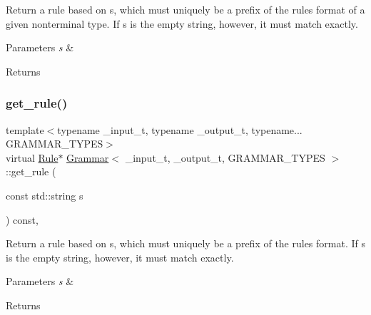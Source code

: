 Return a rule based on s, which must uniquely be a prefix of the rule\textquotesingle{}s format of a given nonterminal type. If s is the empty string, however, it must match exactly. 
\begin{DoxyParams}{Parameters}
{\em s} & \\
\hline
\end{DoxyParams}
\begin{DoxyReturn}{Returns}

\end{DoxyReturn}
\mbox{\label{class_grammar_a742a677c65f8d14394f5370e8800686d}} 
\subsubsection{\texorpdfstring{get\+\_\+rule()}{get\_rule()}\hspace{0.1cm}{\footnotesize\ttfamily [5/5]}}
{\footnotesize\ttfamily template$<$typename \+\_\+input\+\_\+t, typename \+\_\+output\+\_\+t, typename... G\+R\+A\+M\+M\+A\+R\+\_\+\+T\+Y\+P\+ES$>$ \\
virtual \hyperlink{class_rule}{Rule}$\ast$ \hyperlink{class_grammar}{Grammar}$<$ \+\_\+input\+\_\+t, \+\_\+output\+\_\+t, G\+R\+A\+M\+M\+A\+R\+\_\+\+T\+Y\+P\+ES $>$\+::get\+\_\+rule (\begin{DoxyParamCaption}\item[{const std\+::string}]{s }\end{DoxyParamCaption}) const\hspace{0.3cm}{\ttfamily [inline]}, {\ttfamily [virtual]}}

Return a rule based on s, which must uniquely be a prefix of the rule\textquotesingle{}s format. If s is the empty string, however, it must match exactly. 
\begin{DoxyParams}{Parameters}
{\em s} & \\
\hline
\end{DoxyParams}
\begin{DoxyReturn}{Returns}

\end{DoxyReturn}
\mbox{\label{class_grammar_a09dff6ea6759e21aced0f655b496a93a}} 
